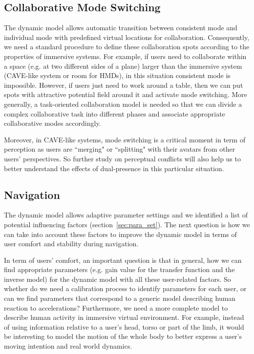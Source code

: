 \subsection*{Collaborative Mode Switching}
The dynamic model allows automatic transition between consistent mode and individual mode with predefined virtual locations for collaboration. Consequently, we need a standard procedure to define these collaboration spots according to the properties of immersive systems. For example, if users need to collaborate within a space (e.g. at two different sides of a plane) larger than the immersive system (CAVE-like system or room for HMDs), in this situation consistent mode is impossible. However, if users just need to work around a table, then we can put spots with attractive potential field around it and activate mode switching. More generally, a task-oriented collaboration model is needed so that we can divide a complex collaborative task into different phases and associate appropriate collaborative modes accordingly. 

Moreover, in CAVE-like systems, mode switching is a critical moment in term of perception as users are ``merging" or ``splitting" with their avatars from other users' perspectives. So further study on perceptual conflicts will also help us to better understand the effects of dual-presence in this particular situation.

\subsection*{Navigation}
The dynamic model allows adaptive parameter settings and we identified a list of potential influencing factors (section~\ref{sec:para_set}). The next question is how we can take into account these factors to improve the dynamic model in terms of user comfort and stability during navigation.

In term of users' comfort, an important question is that in general, how we can find appropriate parameters (e.g. gain value for the transfer function and the inverse model) for the dynamic model with all these user-related factors. So whether do we need a calibration process to identify parameters for each user, or can we find parameters that correspond to a generic model describing human reaction to accelerations? Furthermore, we need a more complete model to describe human activity in immersive virtual environment. For example, instead of using information relative to a user's head, torso or part of the limb, it would be interesting to model the motion of the whole body to better express a user's moving intention and real world dynamics.

